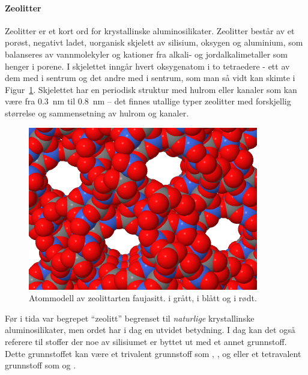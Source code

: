 \paragraph{Zeolitter} Zeolitter er et kort ord for krystallinske aluminosilikater. Zeolitter består av et porøst, negativt ladet, uorganisk skjelett av silisium, oksygen og aluminium, som balanseres av vannmolekyler og kationer fra alkali- og jordalkalimetaller som henger i porene. I skjelettet inngår hvert oksygenatom i to tetraedere - ett av dem med  i sentrum og det andre med  i sentrum, som man så vidt kan skimte i Figur~\ref{fig:faujasite}. Skjelettet har en periodisk struktur med hulrom eller kanaler som kan være fra \SI{0.3}{\nano\meter} til \SI{0.8}{\nano\meter} -- det finnes utallige typer zeolitter med forskjellig størrelse og sammensetning av hulrom og kanaler.
\begin{figure}[H]
	\bmd\centering
	\includegraphics[width=0.9\linewidth]{faujasite.png}
	\caption{Atommodell av zeolittarten faujasitt.  i grått,  i blått og  i rødt.}
	\label{fig:faujasite}
\emd\end{figure}
Før i tida var begrepet ``zeolitt'' begrenset til \emph{naturlige} krystallinske aluminosilikater, men ordet har i dag en utvidet betydning. I dag kan det også referere til stoffer der noe av silisiumet er byttet ut med et annet grunnstoff. Dette grunnstoffet kan være et trivalent grunnstoff som , ,  og  eller et tetravalent grunnstoff som  og .

